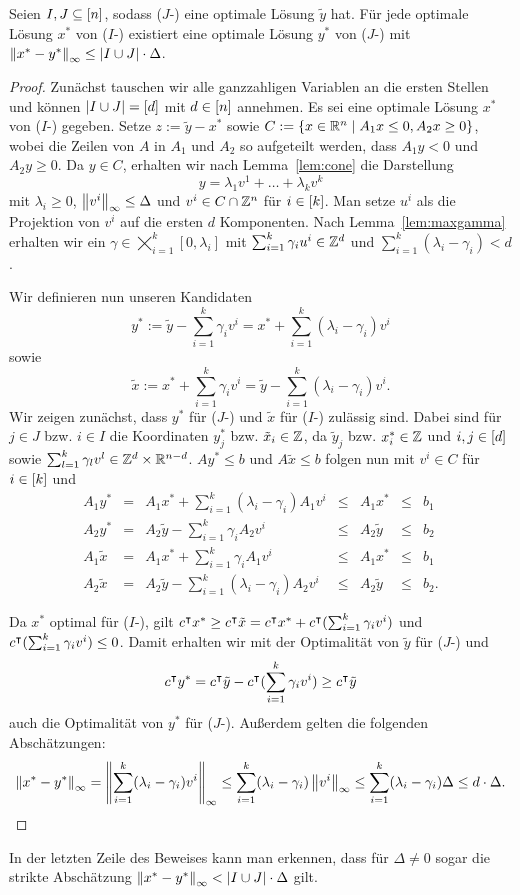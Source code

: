 \begin{theorem}\label{thm:theo2}
	Seien $I,J\subseteq[n]$, sodass ($J$-\MIPR) eine optimale Lösung $\tilde{y}$ hat.
	Für jede optimale Lösung $x^*$ von ($I$-\MIPR) existiert eine optimale Lösung $y^*$ von ($J$-\MIPR) mit $\left\lVert x^*-y^*\right\rVert_\infty\leq\lvert I\cup J \rvert\cdot\Delta$.
\end{theorem}
\begin{proof}
	Zunächst tauschen wir alle ganzzahligen Variablen an die ersten Stellen und können $\lvert I\cup J \rvert=[d]$ mit $d\in[n]$ annehmen.
	Es sei eine optimale Lösung $x^*$ von ($I$-\MIPR) gegeben.
	Setze $z:=\tilde{y}-x^*$ sowie $C:=\{ x\in\mathbb{R}^n \mid A_1 x \leq 0, A_2x\geq0 \}$, wobei die Zeilen von $A$ in $A_1$ und $A_2$ so aufgeteilt werden, dass $A_1y<0$ und $A_2y\geq0$.
	Da $y\in C$, erhalten wir nach Lemma~\ref{lem:cone} die Darstellung 
	$$y = \lambda_1v^1 + \dots+\lambda_kv^k$$
	mit $\lambda_i\geq0$, $\left\lVert v^i\right\rVert_\infty\leq \Delta$ und $v^i\in C\cap\mathbb{Z}^n$ für $i\in[k]$.
	Man setze $u^i$ als die Projektion von $v^i$ auf die ersten $d$ Komponenten.
	Nach Lemma~\ref{lem:maxgamma} erhalten wir ein $\gamma\in\bigtimes_{i=1}^k[0,\lambda_i]$ mit  $\sum_{i=1}^k\gamma_iu^i\in\mathbb{Z}^d$ und $\sum_{i=1}^k(\lambda_i -\gamma_i)<d$.
	
	Wir definieren nun unseren Kandidaten $$y^*:=\tilde{y}-\sum_{i=1}^k\gamma_iv^i=x^*+\sum_{i=1}^k(\lambda_i-\gamma_i)v^i$$
	sowie $$\tilde{x}:=x^*+\sum_{i=1}^k\gamma_iv^i=\tilde{y}-\sum_{i=1}^k(\lambda_i-\gamma_i)v^i.$$
	Wir zeigen zunächst, dass $y^*$ für ($J$-\MIPR) und $\tilde{x}$ für ($I$-\MIPR) zulässig sind.
	Dabei sind für $j\in J$ bzw. $i\in I$ die Koordinaten $y^*_j$ bzw. $\tilde{x}_i\in\mathbb{Z}$, da $\tilde{y}_j$ bzw. $x^*_i\in\mathbb{Z}$ und $i,j\in[d]$ sowie $\sum_{l=1}^k\gamma_lv^l\in\mathbb{Z}^d\times\mathbb{R}^{n-d}$.
	$Ay^*\leq b$ und $A\tilde{x}\leq b$ folgen nun mit $v^i\in C$ für $i\in[k]$ und 
	$$
	\begin{array}{lllllll}
	A_1 y^*&=&A_1x^*+\sum_{i=1}^k(\lambda_i-\gamma_i)A_1v^i &\leq& A_1 x^* &\leq&b_1\\
	A_2 y^*&=&A_2\tilde{y}-\sum_{i=1}^k\gamma_iA_2v^i &\leq& A_2\tilde{y} &\leq& b_2\\
	A_1\tilde{x} &=&A_1x^*+\sum_{i=1}^k \gamma_iA_1v^i &\leq& A_1x^* &\leq&b_1\\
	A_2\tilde{x} &=&A_2\tilde{y}-\sum_{i=1}^k(\lambda_i-\gamma_i)A_2v^i&\leq& A_2\tilde{y}&\leq& b_2.
	\end{array}
	$$
	
	Da $x^*$ optimal für ($I$-\MIPR), gilt $c^\intercal x^*\geq c^\intercal \tilde{x} = c^\intercal x^* + c^\intercal (\sum_{i=1}^k\gamma_iv^i)$ und  $c^\intercal(\sum_{i=1}^k\gamma_iv^i)\leq0$.
	Damit erhalten wir mit der Optimalität von $\tilde{y}$ für ($J$-\MIPR) und
	$$c^\intercal y^*=c^\intercal\tilde{y}-c^\intercal(\sum_{i=1}^k\gamma_iv^i)\geq c^\intercal\tilde{y}$$
	auch die Optimalität von $y^*$ für ($J$-\MIPR).
	Außerdem gelten die folgenden Abschätzungen:
	$$\left\lVert x^*-y^*\right\rVert_\infty=\left\lVert\sum_{i=1}^k(\lambda_i-\gamma_i)v^i\right\rVert_\infty\leq \sum_{i=1}^k(\lambda_i-\gamma_i)\left\lVert v^i\right\rVert_\infty\leq \sum_{i=1}^k(\lambda_i-\gamma_i)\Delta\leq d\cdot\Delta.
	$$
\end{proof}
\begin{remark}
	In der letzten Zeile des Beweises kann man erkennen, dass für $\Delta\neq 0$ sogar die strikte Abschätzung $\left\lVert x^*-y^*\right\rVert_\infty<\lvert I\cup J \rvert\cdot\Delta$ gilt.
\end{remark}

